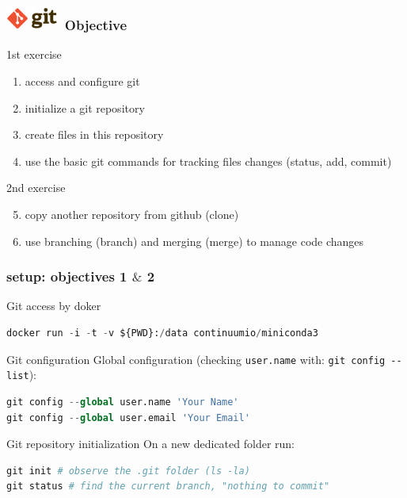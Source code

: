 \begin{frame}[containsverbatim]
\frametitle{\includegraphics[height=0.8cm]{shared/logo-git.png} Objective}
\begin{exampleblock}{1st exercise}
\begin{enumerate}
    \item access and configure git
    \item initialize a git repository
    \item create files in this repository
    \item use the basic git commands for tracking files changes (status, add, commit)
\end{enumerate}
\end{exampleblock}
\begin{exampleblock}{2nd exercise}
\begin{enumerate}
\setcounter{enumi}{4}
    \item copy another repository from github (clone)
    \item use branching (branch) and merging (merge) to manage code changes
\end{enumerate}
\end{exampleblock}
\end{frame}
\begin{frame}[containsverbatim]
\frametitle{  setup: objectives 1 $\&$ 2}
\begin{exampleblock}{Git access by \alert{doker}}
\begin{lstlisting}[language=python]
docker run -i -t -v ${PWD}:/data continuumio/miniconda3
\end{lstlisting}
\end{exampleblock}
\begin{exampleblock}{Git configuration}
Global configuration (checking \verb|user.name| with: \verb|git config --list|):
\begin{lstlisting}[language=python]
git config --global user.name 'Your Name'
git config --global user.email 'Your Email'
\end{lstlisting}
\end{exampleblock}
\begin{exampleblock}{Git repository initialization}
On a new dedicated folder run: 
\begin{lstlisting}[language=python]
git init # observe the .git folder (ls -la)
git status # find the current branch, "nothing to commit"
\end{lstlisting}
\end{exampleblock}
\end{frame}

